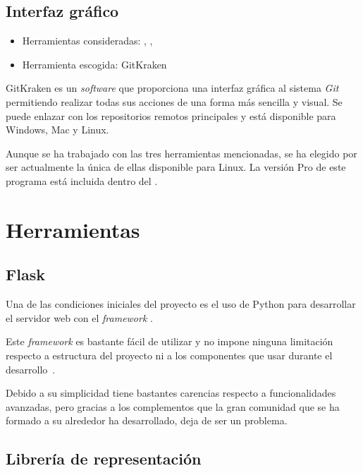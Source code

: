 \subsection{Interfaz gráfico}

\begin{itemize}
	\tightlist
	\item Herramientas consideradas:
	,
	,
	\item Herramienta escogida: GitKraken
\end{itemize}

GitKraken es un \textit{software} que proporciona una interfaz gráfica al
sistema \textit{Git} permitiendo realizar todas sus acciones de una forma más
sencilla y visual. Se puede enlazar con los repositorios remotos principales y
está disponible para Windows, Mac y Linux.

Aunque se ha trabajado con las tres herramientas mencionadas, se ha elegido por
ser actualmente la única de ellas disponible para Linux. La versión Pro de este
programa está incluida dentro del
.

\section{Herramientas}

\subsection{Flask}

Una de las condiciones iniciales del proyecto es el uso de Python para
desarrollar el servidor web con el \textit{framework}
.

Este \textit{framework} es bastante fácil de utilizar y no impone ninguna
limitación respecto a estructura del proyecto ni a los componentes que usar
durante el desarrollo~\cite{grinberg2014flask}.

Debido a su simplicidad tiene bastantes carencias respecto a funcionalidades
avanzadas, pero gracias a los complementos que la gran comunidad que se ha
formado a su alrededor ha desarrollado, deja de ser un problema.

\subsection{Librería de representación}

